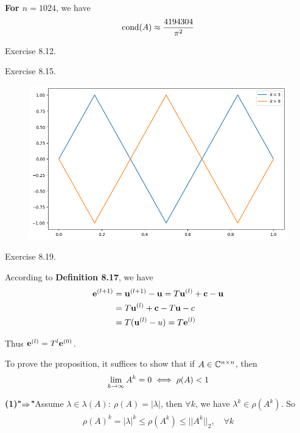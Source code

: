\documentclass{homework}
\begin{document}
	\textbf{For $n = 1024$}, we have
	\begin{eqnarray}
		\text{cond}(A) \approx \frac{4194304}{\pi^2}
	\end{eqnarray}
	
\question Exercise 8.12.

\question Exercise 8.15.

	\begin{figure}[H]
		\centering
		\includegraphics[width=\textwidth]{./media/Ex8_15.png}
	\end{figure}
	

\question Exercise 8.19.
	
	According to \textbf{Definition 8.17}, we have
	\begin{eqnarray}
		\begin{aligned}
			\textbf{e}^{(l+1)} &= \textbf{u}^{(l+1)} - \textbf{u} = T\textbf{u}^{(l)} + \textbf{c} - \textbf{u} \\
			&= T\textbf{u}^{(l)} + \textbf{c} - T\textbf{u} -c\\
			&= T(\textbf{u}^{(l)} - u) = T \textbf{e}^{(l)}
		\end{aligned}
	\end{eqnarray}
	
	Thus $\textbf{e}^{(l)} = T^l \textbf{e}^{(0)}$.
	
	To prove the proposition, it suffices to show that if $A \in \mathbb{C}^{n\times n}$, then
	\begin{eqnarray}
		\lim_{k\rightarrow\infty} A^k = 0 \iff \rho(A) < 1
	\end{eqnarray}
	
	\textbf{(1)"$\Rightarrow$"}\quad Assume $\lambda\in\lambda(A):\ \rho(A)=|\lambda|$, then $\forall k$, we have $\lambda^k \in \rho(A^k)$. So
	\begin{eqnarray}
		\begin{aligned}
			\rho(A)^k = |\lambda|^k \leq \rho(A^k) \leq ||A^k||_2,\quad \forall k
		\end{aligned}
	\end{eqnarray}
	
\end{document}
